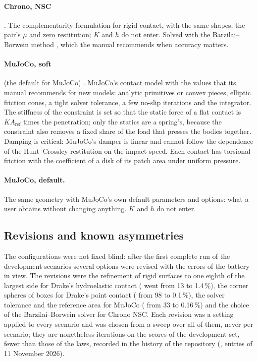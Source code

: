 \paragraph{Chrono, NSC} \cite{ChronoSystem}. The complementarity formulation for rigid contact,
with the same shapes, the pair's $\mu$ and zero restitution; $K$ and $h$ do not enter. Solved
with the Barzilai--Borwein method \cite{Barzilai1988}, which the manual recommends when
accuracy matters.

\paragraph{MuJoCo, soft} (the default for MuJoCo) \cite{MuJoCoDocs,MuJoCoModeling}. MuJoCo's
contact model with the values that its manual recommends for new models: analytic primitives
or convex pieces, elliptic friction cones, a tight solver tolerance, a few no-slip iterations
and the  integrator. The stiffness of the constraint is set so that the
static force of a flat contact is $K A_\mathrm{ref}$ times the penetration; only the statics
are a spring's, because the constraint also removes a fixed share of the load that presses the
bodies together. Damping is critical: MuJoCo's damper is linear and cannot follow the dependence
of the Hunt--Crossley restitution on the impact speed. Each contact has torsional friction with
the coefficient of a disk of its patch area under uniform pressure.

\paragraph{MuJoCo, default.} The same geometry with MuJoCo's own default parameters and
options: what a user obtains without changing anything. $K$ and $h$ do not enter.

\subsection{Revisions and known asymmetries}

The configurations were not fixed blind: after the first complete run of the development
scenarios several options were revised with the errors of the battery in view. The revisions
were the refinement of rigid surfaces to one eighth of the largest side for Drake's
hydroelastic contact ( went from 13 to 1.4\,\%), the corner spheres of boxes for
Drake's point contact ( from 98 to 0.1\,\%), the solver tolerance and the reference
area for MuJoCo ( from 33 to 0.16\,\%) and the choice of the Barzilai--Borwein solver
for Chrono NSC. Each revision was a setting applied to every scenario and was chosen from a
sweep over all of them, never per scenario; they are nonetheless iterations on the scores of
the development set, fewer than those of the laws, recorded in the history of the repository
(, entries of 11 November 2026). %

